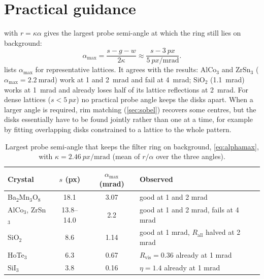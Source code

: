 \documentclass[11pt,a4paper]{article}
\newcommand{\Rvis}{R_{\mathrm{vis}}}
\newcommand{\Rall}{R_{\mathrm{all}}}
\begin{document}
\section{Practical guidance}\label{sec:guide}
 with $r = \kappa\alpha$ gives the largest probe semi-angle at which the ring still lies on background:
\begin{equation}
  \alpha_{\max} = \frac{s - g - w}{2\kappa} \approx \frac{s - \SI{3}{px}}{\SI{5}{px\per\milli\radian}} .
  \label{eq:alphamax}
\end{equation}
 lists $\alpha_{\max}$ for representative lattices. It agrees with the results: AlCo$_3$ and ZrSn$_3$
($\alpha_{\max} = \SI{2.2}{\milli\radian}$) work at 1 and \SI{2}{\milli\radian} and fail at \SI{4}{\milli\radian};
SiO$_2$ (\SI{1.1}{\milli\radian}) works at \SI{1}{\milli\radian} and already loses half of its lattice reflections at
\SI{2}{\milli\radian}. For dense lattices ($s < \SI{5}{px}$) no practical probe angle keeps the disks apart. When a larger
angle is required, rim matching (\cref{sec:sobel}) recovers some centres, but the disks essentially have to be found
jointly rather than one at a time, for example by fitting overlapping disks constrained to a lattice to the whole pattern.

\begin{table}[!htbp]
  \centering
  \caption{Largest probe semi-angle that keeps the filter ring on background, \cref{eq:alphamax}, with
  $\kappa = \SI{2.46}{px\per\milli\radian}$ (mean of $r/\alpha$ over the three angles).}
  \label{tab:alphamax}
  \small
  \begin{tabular}{l c c l}
    \toprule
    Crystal & $s$ (px) & $\alpha_{\max}$ (mrad) & Observed \\
    \midrule
    Ba$_2$Mn$_3$O$_8$  & 18.1 & 3.07 & good at 1 and 2 mrad \\
    AlCo$_3$, ZrSn$_3$ & 13.8--14.0 & 2.2 & good at 1 and 2 mrad, fails at 4 mrad \\
    SiO$_2$            & 8.6  & 1.14 & good at 1 mrad, $\Rall$ halved at 2 mrad \\
    HoTe$_3$           & 6.3  & 0.67 & $\Rvis = 0.36$ already at 1 mrad \\
    SiI$_3$            & 3.8  & 0.16 & $\eta = 1.4$ already at 1 mrad \\
    \bottomrule
  \end{tabular}
\end{table}

\end{document}
